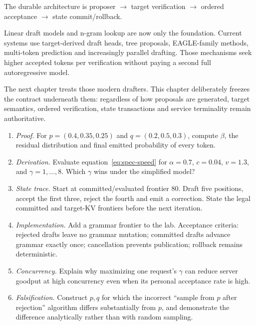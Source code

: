 The durable architecture is proposer $\rightarrow$ target verification $\rightarrow$
ordered acceptance $\rightarrow$ state commit/rollback.


Linear draft models and n-gram lookup are now only the foundation. Current systems use
target-derived draft heads, tree proposals, EAGLE-family methods, multi-token prediction
and increasingly parallel drafting. Those mechanisms seek higher accepted tokens per
verification without paying a second full autoregressive model.

The next chapter treats those modern drafters. This chapter deliberately freezes the
contract underneath them: regardless of how proposals are generated, target semantics,
ordered verification, state transactions and service terminality remain authoritative.

\ExercisesSection
\begin{enumerate}
\item \emph{Proof.} For $p=(0.4,0.35,0.25)$ and $q=(0.2,0.5,0.3)$, compute
$\beta$, the residual distribution and final emitted probability of every token.
\item \emph{Derivation.} Evaluate equation~\eqref{eq:spec-speed} for
$\alpha=0.7$, $c=0.04$, $v=1.3$, and $\gamma=1,\ldots,8$. Which $\gamma$ wins under
the simplified model?
\item \emph{State trace.} Start at committed/evaluated frontier 80. Draft five
positions, accept the first three, reject the fourth and emit a correction. State the
legal committed and target-KV frontiers before the next iteration.
\item \emph{Implementation.} Add a grammar frontier to the lab. Acceptance criteria:
rejected drafts leave no grammar mutation; committed drafts advance grammar exactly
once; cancellation prevents publication; rollback remains deterministic.
\item \emph{Concurrency.} Explain why maximizing one request's $\gamma$ can reduce
server goodput at high concurrency even when its personal acceptance rate is high.
\item \emph{Falsification.} Construct $p,q$ for which the incorrect ``sample from
$p$ after rejection'' algorithm differs substantially from $p$, and demonstrate the
difference analytically rather than with random sampling.
\end{enumerate}


